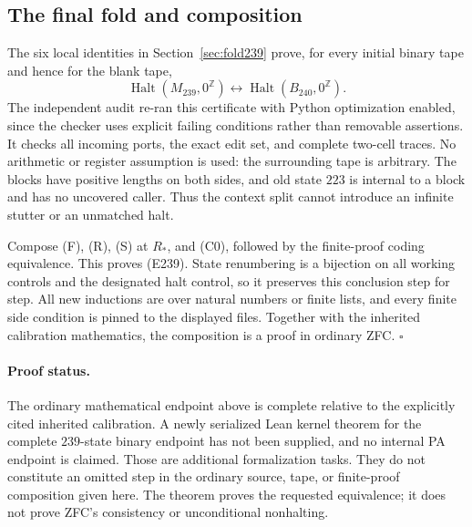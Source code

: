 \subsection{The final fold and composition}

The six local identities in Section~\ref{sec:fold239}
prove, for every initial binary tape and hence for the blank tape,
\[
 \operatorname{Halt}(M_{239},0^\mathbb Z)
 \longleftrightarrow
 \operatorname{Halt}(B_{240},0^\mathbb Z).
 \tag{F}
\]
The independent audit re-ran this certificate with Python optimization
enabled, since the checker uses explicit failing conditions rather
than removable assertions.  It checks all incoming ports, the exact
edit set, and complete two-cell traces.  No arithmetic or register
assumption is used: the surrounding tape is arbitrary.  The blocks
have positive lengths on both sides, and old state $223$ is internal
to a block and has no uncovered caller.  Thus the context split
cannot introduce an infinite stutter or an unmatched halt.

Compose (F), (R), (S) at $R_*$, and (C0), followed by the finite-proof
coding equivalence.  This proves (E239).  State renumbering is a
bijection on all working controls and the designated halt control,
so it preserves this conclusion step for step.  All new inductions
are over natural numbers or finite lists, and every finite side
condition is pinned to the displayed files.  Together with the
inherited calibration mathematics, the composition is a proof in
ordinary ZFC. \hfill$\square$

\paragraph{Proof status.}
The ordinary mathematical endpoint above is complete relative to the
explicitly cited inherited calibration.  A newly serialized Lean
kernel theorem for the complete $239$-state binary endpoint has not
been supplied, and no internal PA endpoint is claimed.  Those are
additional formalization tasks.  They do not constitute an omitted
step in the ordinary source, tape, or finite-proof composition given
here.  The theorem proves the requested equivalence; it does not
prove ZFC's consistency or unconditional nonhalting.
